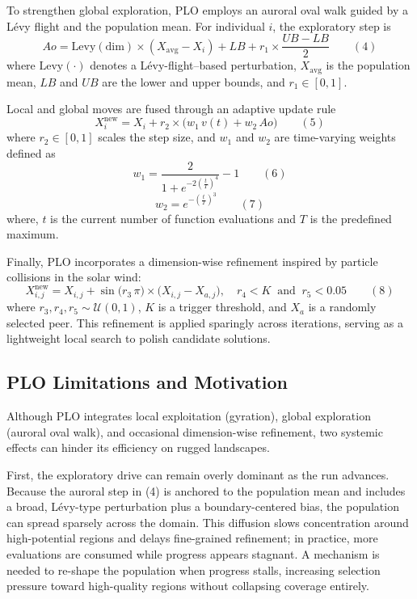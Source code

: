 \documentclass[3p]{elsarticle}
\begin{document}
To strengthen global exploration, PLO employs an auroral oval walk guided by a Lévy flight and the population mean. For individual \(i\), the exploratory step is
\[ Ao = \mathrm{Levy}(\mathrm{dim})\times(X_{\mathrm{avg}} - X_i) + LB + r_1\times\frac{UB - LB}{2} \qquad(4) \]
where \(\mathrm{Levy}(\cdot)\) denotes a Lévy-flight–based perturbation, \(X_{\mathrm{avg}}\) is the population mean, \(LB\) and \(UB\) are the lower and upper bounds, and \(r_1\in[0,1]\).

Local and global moves are fused through an adaptive update rule
\[ X_i^{\mathrm{new}} = X_i + r_2\times\bigl(w_1\,v(t) + w_2\,Ao\bigr) \qquad(5) \]
where \(r_2\in[0,1]\) scales the step size, and \(w_1\) and \(w_2\) are time-varying weights defined as
\[ w_1 = \frac{2}{1 + e^{-2\left(\tfrac{t}{T}\right)^{4}}} - 1 \qquad(6) \]
\[ w_2 = e^{-\left(\tfrac{t}{T}\right)^{3}} \qquad(7) \]
where, \(t\) is the current number of function evaluations and \(T\) is the predefined maximum.

Finally, PLO incorporates a dimension-wise refinement inspired by particle collisions in the solar wind:
\[ X_{i,j}^{\mathrm{new}} = X_{i,j} + \sin\!\bigl(r_3\,\pi\bigr)\times\bigl(X_{i,j} - X_{a,j}\bigr),\quad r_4 < K\ \text{ and }\ r_5 < 0.05 \qquad(8) \]
where \(r_3, r_4, r_5\sim\mathcal{U}(0,1)\), \(K\) is a trigger threshold, and \(X_a\) is a randomly selected peer. This refinement is applied sparingly across iterations, serving as a lightweight local search to polish candidate solutions.

\subsection{PLO Limitations and Motivation}
Although PLO integrates local exploitation (gyration), global exploration (auroral oval walk), and occasional dimension-wise refinement, two systemic effects can hinder its efficiency on rugged landscapes.

First, the exploratory drive can remain overly dominant as the run advances. Because the auroral step in (4) is anchored to the population mean and includes a broad, Lévy-type perturbation plus a boundary-centered bias, the population can spread sparsely across the domain. This diffusion slows concentration around high-potential regions and delays fine-grained refinement; in practice, more evaluations are consumed while progress appears stagnant. A mechanism is needed to re-shape the population when progress stalls, increasing selection pressure toward high-quality regions without collapsing coverage entirely.
\end{document}
